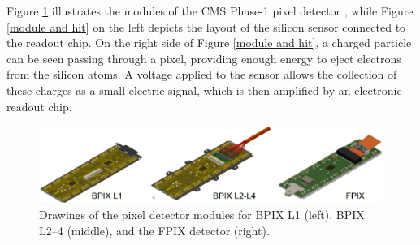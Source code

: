 Figure \ref{modules_drawing} illustrates the modules of the CMS Phase-1 pixel detector \cite{phase1_Pixel_Detector}, while Figure \ref{module and hit} on the left depicts the layout of the silicon sensor connected to the readout chip. On the right side of Figure \ref{module and hit}, a charged particle can be seen passing through a pixel, providing enough energy to eject electrons from the silicon atoms. A voltage applied to the sensor allows the collection of these charges as a small electric signal, which is then amplified by an electronic readout chip.

\begin{center}
  \begin{figure}[h]
    \centering
    \includegraphics[scale=.2]{Chapter2/modules_drawing.png}
    \caption[Pixel detector modules]{ Drawings of the pixel detector modules for BPIX L1 (left), BPIX L2–4 (middle), and the FPIX detector (right)\cite{phase1_Pixel_Detector}.}
    \label{modules_drawing}
  \end{figure}
\end{center}

